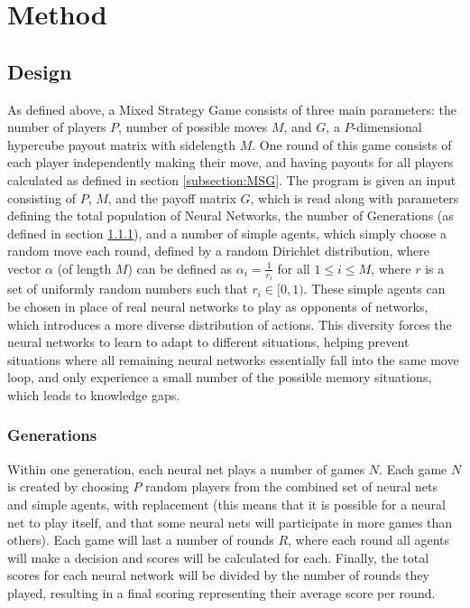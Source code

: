 \documentclass{article}
\begin{document}
\section{Method}
\subsection{Design}
\label{section:DES}
As defined above, a Mixed Strategy Game consists of three main parameters: the number of players $P$, number of possible moves $M$, and $G$, a $P$-dimensional hypercube payout matrix with sidelength $M$. One round of this game consists of each player independently making their move, and having payouts for all players calculated as defined in section \ref{subsection:MSG}. The program is given an input consisting of $P$, $M$, and the payoff matrix $G$, which is read along with parameters defining the total population of Neural Networks, the number of Generations (as defined in section \ref{subsection:GENS}), and a number of simple agents, which simply choose a random move each round, defined by a random Dirichlet distribution, where vector $\alpha$ (of length $M$) can be defined as $\alpha_i = \frac{1}{r_i}$ for all $1\leq i \leq M$, where $r$ is a set of uniformly random numbers such that $r_i\in[0,1)$. These simple agents can be chosen in place of real neural networks to play as opponents of networks, which introduces a more diverse distribution of actions. This diversity forces the neural networks to learn to adapt to different situations, helping prevent situations where all remaining neural networks essentially fall into the same move loop, and only experience a small number of the possible memory situations, which leads to knowledge gaps.

\subsubsection{Generations}
\label{subsection:GENS}
Within one generation, each neural net plays a number of games $N$. Each game $N$ is created by choosing $P$ random players from the combined set of neural nets and simple agents, with replacement (this means that it is possible for a neural net to play itself, and that some neural nets will participate in more games than others). Each game will last a number of rounds $R$, where each round all agents will make a decision and scores will be calculated for each. Finally, the total scores for each neural network will be divided by the number of rounds they played, resulting in a final scoring representing their average score per round.
\end{document}

